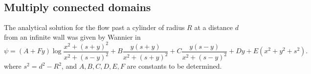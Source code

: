 \subsection{Multiply connected domains}


The analytical solution for the flow past a cylinder of radius $R$ at a distance $d$ from an infinite wall was given by Wannier in \cite{Wannier50}
\begin{equation}
\psi = (A + Fy)\log \frac{x^2 + (s+y)^2}{x^2 + (s-y)^2} + B \frac{y(s+y)}{x^2 + (s+y)^2} + C \frac{y(s-y)}{x^2+(s-y)^2} + Dy + E\left(x^2+y^2+s^2\right).
\end{equation}
where $s^2=d^2-R^2$, and $A,B,C,D,E,F$ are constants to be determined.


